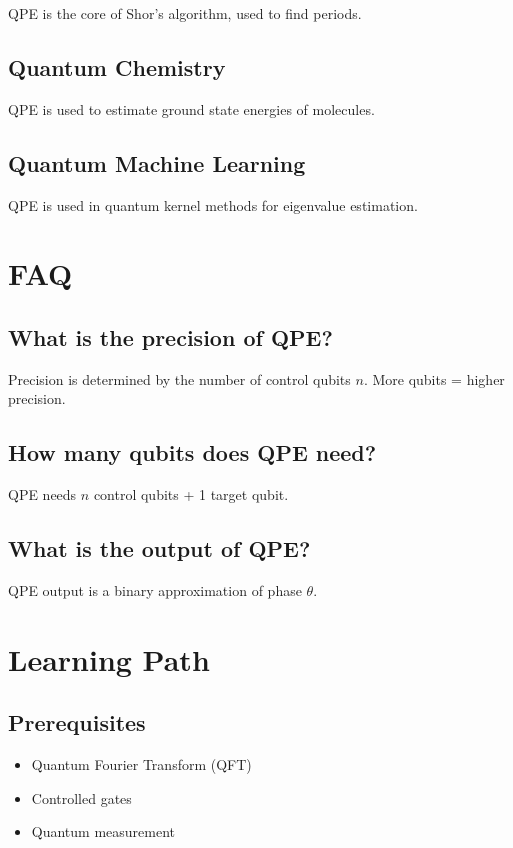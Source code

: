 \documentclass[12pt,a4paper]{article}
\begin{document}
QPE is the core of Shor's algorithm, used to find periods.

\subsection{Quantum Chemistry}

QPE is used to estimate ground state energies of molecules.

\subsection{Quantum Machine Learning}

QPE is used in quantum kernel methods for eigenvalue estimation.

\section{FAQ}

\subsection{What is the precision of QPE?}

Precision is determined by the number of control qubits $n$. More qubits = higher precision.

\subsection{How many qubits does QPE need?}

QPE needs $n$ control qubits + 1 target qubit.

\subsection{What is the output of QPE?}

QPE output is a binary approximation of phase $\theta$.

\section{Learning Path}

\subsection{Prerequisites}
\begin{itemize}
  \item Quantum Fourier Transform (QFT)
  \item Controlled gates
  \item Quantum measurement
\end{itemize}
\end{document}
